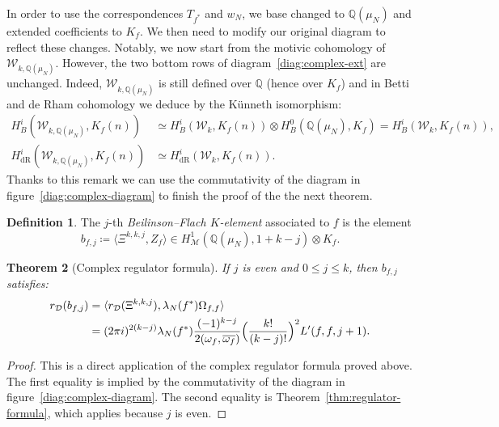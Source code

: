 \documentclass[11pt, a4paper, reqno]{amsart}
\theoremstyle{definition}
\newtheorem{definition}{Definition}[subsection]
\theoremstyle{plain}
\newtheorem{theorem}[definition]{Theorem}
\theoremstyle{remark}
\DeclareMathOperator{\dR}{dR}
\DeclareMathOperator{\mot}{\mathscr{M}}
\newcommand{\numberset}{\mathbb}
\newcommand{\Q}{\numberset{Q}}
\newcommand{\KS}{\mathscr{W}}
\newcommand{\cBF}{\Xi}
\newcommand{\del}{\mathcal{D}}
\newcommand{\regulator}[1]{r_{#1}}
\newcommand{\rD}{\regulator{\del}}
\renewcommand{\le}{\leqslant}
\renewcommand{\leq}{\le}
\begin{document}
In order to use the correspondences $T_{f^*}$ and $w_N$, we base changed to $\Q(\mu_N)$ and extended coefficients to $K_f$. We then need to modify our original diagram to reflect these changes. Notably, we now start from the motivic cohomology of $\KS_{k,\Q(\mu_N)}$. However, the two bottom rows of diagram~\eqref{diag:complex-ext} are unchanged. Indeed, $\KS_{k,\Q(\mu_N)}$ is still defined over $\Q$ (hence over $K_f$) and in Betti and de Rham cohomology we deduce by the Künneth isomorphism:
\begin{align*}
    H_B^i(\KS_{k,\Q(\mu_N)},K_f(n)) &\simeq H_B^i(\KS_k,K_f(n)) \otimes H_B^0(\Q(\mu_N),K_f) = H_B^i(\KS_k,K_f(n)), \\
    H_{\dR}^i(\KS_{k,\Q(\mu_N)},K_f(n)) &\simeq H_{\dR}^i(\KS_k,K_f(n)).
\end{align*}
Thanks to this remark we can use the commutativity of the diagram in figure~\ref{diag:complex-diagram} to finish the proof of the the next theorem.

  \begin{definition}\label{def:BFKelt}
   The $j$-th \emph{Beilinson--Flach $K$-element} associated to $f$ is the element
   \[
    b_{f, j} \coloneqq \langle\cBF^{k,k,j}, Z_f\rangle \in H^1_{\mot}(\Q(\mu_N), 1+k-j)\otimes K_f.
   \]
  \end{definition}
  
\begin{theorem}[Complex regulator formula]
    \label{thm:complex-l-value}
    If $j$ is even and $0\leq j\leq k$, then $b_{f, j}$ satisfies:
    \begin{equation}
        \label{eq:deligne-regulator-bf}
        \begin{split}
            \rD(b_{f, j}) &= \langle \rD(\cBF^{k,k,j}), \lambda_N(f^*)\Omega_{f,f} \rangle \\
            &= (2\pi i)^{2(k-j)}\lambda_N(f^*)\frac{(-1)^{k-j}}{2(\omega_f,\overline{\omega_f})}\Bigl( \frac{k!}{(k-j)!} \Bigr)^2 L'(f,f,j+1).
        \end{split}
    \end{equation}
\end{theorem}
\begin{proof}
    This is a direct application of the complex regulator formula proved above. The first equality is implied by the commutativity of the diagram in figure~\ref{diag:complex-diagram}. The second equality is Theorem~\ref{thm:regulator-formula}, which applies because $j$ is even.
\end{proof}
\end{document}
